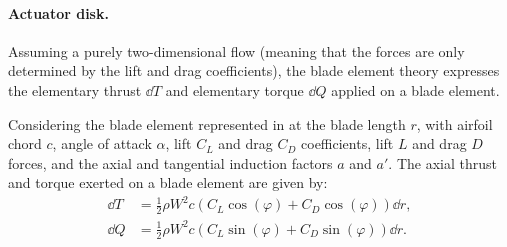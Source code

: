 \paragraph{Actuator disk.}
Assuming a purely two-dimensional flow (meaning that the forces are only determined by the lift and drag coefficients), the blade element theory expresses the elementary thrust $\dd T$ and elementary torque $\dd Q$ applied on a blade element.

Considering the blade element represented in  at the blade length $r$, with airfoil chord $c$, angle of attack $\alpha$,  lift $C_L$ and drag $C_D$ coefficients, lift $L$ and drag $D$ forces, and the axial and tangential induction factors $a$ and $a'$. 
The axial thrust and torque exerted on a blade element are given by:
\begin{subequations}
    \begin{align}
        \dd T &= \frac12 \rho W^2 c \left(C_L \cos(\varphi) + C_D \cos(\varphi)\right) \dd r,\\
        \dd Q &= \frac12 \rho W^2 c \left(C_L \sin(\varphi) + C_D \sin(\varphi)\right) \dd r.
    \end{align}
    \label{eq:blade_element}    
\end{subequations}

